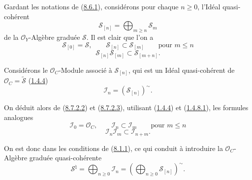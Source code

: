 \begin{env}[8.7.2]
\label{II.8.7.2-fr}
Gardant les notations de (\hyperref[II.8.6.1-fr]{8.6.1}), considérons pour
chaque $n\geqslant 0$, l'Idéal quasi-cohérent
\begin{equation}
\label{II.8.7.2.1-fr}
  \mathcal{S}_{[n]}=\bigoplus_{m\geqslant n}\mathcal{S}_m
\tag{8.7.2.1}
\end{equation}
de la $\mathcal{O}_Y$-Algèbre graduée $\mathcal{S}$. Il est clair que l'on a
\begin{equation}
\label{II.8.7.2.2-fr}
  \mathcal{S}_{[0]}=\mathcal{S},\qquad
  \mathcal{S}_{[n]}\subset\mathcal{S}_{[m]}
  \qquad\text{pour }m\leqslant n
\tag{8.7.2.2}
\end{equation}
\begin{equation}
\label{II.8.7.2.3-fr}
  \mathcal{S}_{[n]}\mathcal{S}_{[m]}\subset\mathcal{S}_{[m+n]}.
\tag{8.7.2.3}
\end{equation}

Considérons le $\mathcal{O}_C$-Module associé à $\mathcal{S}_{[n]}$, qui est un
Idéal quasi-cohérent de $\mathcal{O}_C=\widetilde{\mathcal{S}}$
(\hyperref[II.1.4.4-fr]{1.4.4})
\begin{equation}
\label{II.8.7.2.4-fr}
  \mathcal{I}_n=(\mathcal{S}_{[n]})^{\sim}.
\tag{8.7.2.4}
\end{equation}

On déduit alors de (\hyperref[II.8.7.2.2-fr]{8.7.2.2}) et
(\hyperref[II.8.7.2.3-fr]{8.7.2.3}), utilisant
(\hyperref[II.1.4.4-fr]{1.4.4}) et (\hyperref[II.1.4.8.1-fr]{1.4.8.1}),
les formules analogues
\begin{equation}
\label{II.8.7.2.5-fr}
  \mathcal{I}_0=\mathcal{O}_C,\qquad
  \mathcal{I}_n\subset\mathcal{I}_m
  \qquad\text{pour }m\leqslant n
\tag{8.7.2.5}
\end{equation}
\begin{equation}
\label{II.8.7.2.6-fr}
  \mathcal{I}_n\mathcal{I}_m\subset\mathcal{I}_{n+m}.
\tag{8.7.2.6}
\end{equation}

On est donc dans les conditions de (\hyperref[II.8.1.1-fr]{8.1.1}), ce qui
conduit à introduire la $\mathcal{O}_C$-Algèbre graduée quasi-cohérente
\begin{equation}
\label{II.8.7.2.7-fr}
  \mathcal{S}^{\natural}
  =\bigoplus_{n\geqslant 0}\mathcal{I}_n
  =\left(\bigoplus_{n\geqslant 0}\mathcal{S}_{[n]}\right)^{\sim}.
\tag{8.7.2.7}
\end{equation}
\end{env}

